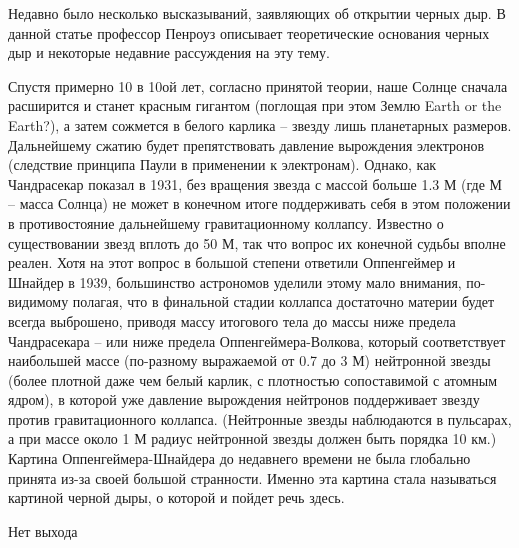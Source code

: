 \documentclass[a4paper, 10pt, twocolumn]{article}
\def\q#1{{\color{red} #1}}
\begin{document}


Недавно было несколько высказываний, заявляющих об открытии черных дыр. 
В данной статье профессор Пенроуз описывает теоретические основания 
черных дыр и некоторые недавние рассуждения на эту тему.

Спустя примерно 10 в 10ой лет, согласно принятой теории, наше Солнце 
сначала расширится и станет красным гигантом (поглощая при этом Землю 
\q{Earth or the Earth?}), а затем сожмется в белого карлика -- звезду 
лишь планетарных размеров. Дальнейшему сжатию будет препятствовать 
давление вырождения электронов (следствие принципа Паули в применении 
к электронам). Однако, как Чандрасекар показал в 1931, без вращения 
звезда с массой больше 1.3 М (где М -- масса Солнца) не может в конечном 
итоге поддерживать себя в этом положении в противостояние дальнейшему 
гравитационному коллапсу. Известно о существовании звезд вплоть до 50 М, 
так что вопрос их конечной судьбы вполне реален. Хотя на этот вопрос 
в большой степени ответили Оппенгеймер и Шнайдер в 1939, большинство 
астрономов уделили этому мало внимания, по-видимому полагая, что 
в финальной стадии коллапса достаточно материи будет всегда выброшено, 
приводя массу итогового тела до массы ниже предела Чандрасекара -- или 
ниже предела Оппенгеймера-Волкова, который соответствует наибольшей 
массе (по-разному выражаемой от 0.7 до 3 М) нейтронной звезды (более 
плотной даже чем белый карлик, с плотностью сопоставимой с атомным 
ядром), в которой уже давление вырождения нейтронов поддерживает звезду 
против гравитационного коллапса. (Нейтронные звезды наблюдаются 
в пульсарах, а при массе около 1 М радиус нейтронной звезды должен быть 
порядка 10 км.) Картина Оппенгеймера-Шнайдера до недавнего времени не 
была глобально принята из-за своей большой странности. Именно эта 
картина стала называться картиной черной дыры, о которой и пойдет речь 
здесь.



{\large Нет выхода}
\end{document}

